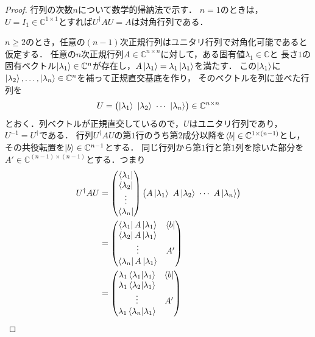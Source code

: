 \begin{proof}
  行列の次数$n$について数学的帰納法で示す．
  $n=1$のときは，$U=I_1\in\mathbb C^{1\times1}$とすれば$U^\dagger AU=A$は対角行列である．

  $n\geq2$のとき，任意の$(n-1)$次正規行列はユニタリ行列で対角化可能であると仮定する．
  任意の$n$次正規行列$A\in\mathbb C^{n\times n}$に対して，ある固有値$\lambda_1\in\mathbb C$と
  長さ$1$の固有ベクトル$\ket{\lambda_1}\in\mathbb C^n$が存在し，$A\ket{\lambda_1}=\lambda_1\ket{\lambda_1}$を満たす．
  この$\ket{\lambda_1}$に$\ket{\lambda_2},\ldots,\ket{\lambda_n}\in\mathbb C^n$を補って正規直交基底を作り，
  そのベクトルを列に並べた行列を
  \begin{equation*}
    U=\bigl(\ket{\lambda_1}\ \ket{\lambda_2}\ \cdots\ \ket{\lambda_n}\bigr)\in\mathbb C^{n\times n}
  \end{equation*}
  とおく．列ベクトルが正規直交しているので，$U$はユニタリ行列であり，$U^{-1}=U^\dagger$である．
  行列$U^\dagger AU$の第$1$行のうち第$2$成分以降を$\bra{b}\in\mathbb C^{1\times(n-1)}$とし，
  その共役転置を$\ket{b}\in\mathbb C^{n-1}$とする．
  同じ行列から第$1$行と第$1$列を除いた部分を$A'\in\mathbb C^{(n-1)\times(n-1)}$とする．つまり
  \begin{align*}
    U^\dagger AU
      &=\begin{pmatrix}
          \bra{\lambda_1}\\ \bra{\lambda_2}\\ \vdots\\ \bra{\lambda_n}
        \end{pmatrix}
        \bigl(A\ket{\lambda_1}\ A\ket{\lambda_2}\ \cdots\ A\ket{\lambda_n}\bigr)\\
      &=\begin{pmatrix}
          \bra{\lambda_1}A\ket{\lambda_1} & \bra{b}\\
          \bra{\lambda_2}A\ket{\lambda_1} &  \\
          \vdots & A'\\
          \bra{\lambda_n}A\ket{\lambda_1} &
        \end{pmatrix}\\
      &=\begin{pmatrix}
        \lambda_1\braket{\lambda_1|\lambda_1} & \bra{b}\\
          \lambda_1\braket{\lambda_2|\lambda_1} &  \\
          \vdots & A'\\
          \lambda_1\braket{\lambda_n|\lambda_1} &  \\

\end{pmatrix}
\end{align*}
\end{proof}
